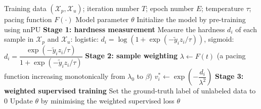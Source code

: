 \documentclass{article}
\begin{document}
\begin{algorithm}[!h]
\renewcommand{\algorithmicrequire}{\textbf{Input:}} %
\renewcommand{\algorithmicensure}{\textbf{Output:}} %
	\caption{Robust-PU (curriculum learning with noise-negative self-correction)} %
	\begin{algorithmic}[1] %
	    \REQUIRE
	    Training data $(\mathcal{X}_{p},\mathcal{X}_{u})$; iteration number $T$; epoch number $E$;
	    temperature $\tau$; pacing function $F(\cdot)$
	    \ENSURE
	    Model parameter $\theta$
	    \STATE Initialize the model by pre-training using nnPU %
	    \STATE \textbf{Stage 1: hardness measurement}
	    \STATE Measure the hardness $d_{i}$ of each sample in $\mathcal{X}_{p}$ and $\mathcal{X}_{u}$:
	    \STATE \quad logistic: $d_{i}=\log\!\left(1+\exp(-\tilde{y}_{i}z_{i}/\tau)\right)$,\qquad
	    sigmoid: $d_{i}=\dfrac{\exp(-\tilde{y}_{i}z_{i}/\tau)}{1+\exp(-\tilde{y}_{i}z_{i}/\tau)}$ %
	    \STATE \textbf{Stage 2: sample weighting}
	    \STATE $\lambda\leftarrow F(t)$ \quad (a pacing function increasing monotonically from
	    $\lambda_{0}$ to $\beta$) %
	    \STATE $v_{i}^{\ast}\leftarrow \exp\!\left(-\dfrac{d_{i}}{\lambda^{2}}\right)$ %
	    \STATE \textbf{Stage 3: weighted supervised training}
	    \STATE Set the ground-truth label of unlabeled data to $0$ %
	    \STATE Update $\theta$ by minimising the weighted supervised loss
	    \ENDFOR
	    \ENDFOR
		\RETURN $\theta$
	\end{algorithmic}
\end{algorithm}
\end{document}
